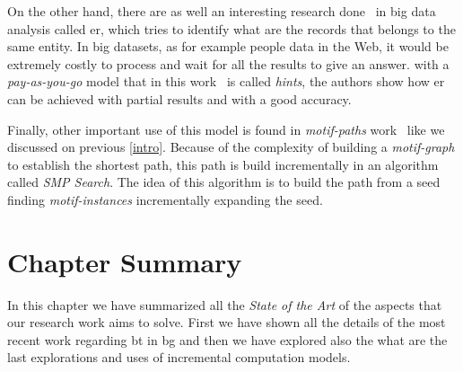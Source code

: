 On the other hand, there are as well an interesting research done~\cite{erpayasyougo} in big data analysis called \acrfull{er}, which tries to identify what are the records that belongs to the same entity.
In big datasets, as for example people data in the Web, it would be extremely costly to process and wait for all the results to give an answer. with a \emph{pay-as-you-go} model that in this work~\cite{erpayasyougo} is called 
\emph{hints}, the authors show how \acrshort{er} can be achieved with partial results and with a good accuracy.

Finally, other important use of this model is found in \emph{motif-paths} work~\cite{Li2019MotifPA} like we discussed on previous \autoref{intro}.
Because of the complexity of building a \emph{motif-graph} to establish the shortest path, this path is build incrementally in an algorithm called \emph{SMP Search}.
The idea of this algorithm is to build the path from a seed finding \emph{motif-instances} incrementally expanding the seed.

\section{Chapter Summary}
In this chapter we have summarized all the \emph{State of the Art} of the aspects that our research work aims to solve.
First we have shown all the details of the most recent work regarding \acrlong{bt} in \acrlong{bg} and then we have explored
also the what are the last explorations and uses of incremental computation models.
